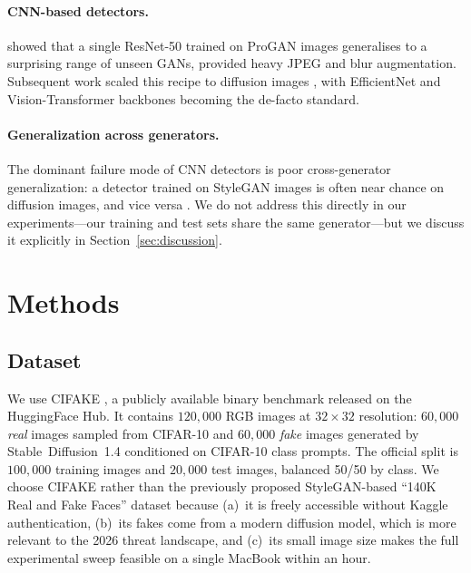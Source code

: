 \documentclass{article}
\begin{document}
\paragraph{CNN-based detectors.}
\citet{wang2020cnnspot} showed that a single \mbox{ResNet-50} trained
on ProGAN images generalises to a surprising range of unseen GANs,
provided heavy JPEG and blur augmentation. Subsequent work scaled this
recipe to diffusion images \citep{ojha2023towards}, with EfficientNet
and Vision-Transformer backbones becoming the de-facto standard.

\paragraph{Generalization across generators.}
The dominant failure mode of CNN detectors is poor cross-generator
generalization: a detector trained on StyleGAN images is often near
chance on diffusion images, and vice versa
\citep{ojha2023towards,corvi2023detection}. We do not address this
directly in our experiments---our training and test sets share the
same generator---but we discuss it explicitly in
Section~\ref{sec:discussion}.

\section{Methods}
\label{sec:methods}

\subsection{Dataset}
\label{sec:dataset}

We use \textsc{CIFAKE} \citep{bird2024cifake}, a publicly available
binary benchmark released on the HuggingFace Hub. It contains
$120{,}000$ RGB images at $32\times32$ resolution: $60{,}000$
\emph{real} images sampled from CIFAR-10 \citep{krizhevsky2009cifar}
and $60{,}000$ \emph{fake} images generated by Stable~Diffusion~1.4
\citep{rombach2022stablediffusion} conditioned on CIFAR-10 class
prompts. The official split is $100{,}000$ training images and
$20{,}000$ test images, balanced 50/50 by class. We choose
\textsc{CIFAKE} rather than the previously proposed StyleGAN-based
``140K Real and Fake Faces'' dataset because (a)~it is freely
accessible without Kaggle authentication, (b)~its fakes come from a
modern diffusion model, which is more relevant to the 2026 threat
landscape, and (c)~its small image size makes the full experimental
sweep feasible on a single MacBook within an hour.
\end{document}
